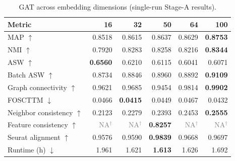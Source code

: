 \documentclass[10pt]{article}
\begin{document}
\begin{table}[H]
\centering
\scriptsize
\caption{GAT across embedding dimensions (single-run Stage-A results).}
\begin{tabular}{@{}lrrrrr@{}}
\toprule
Metric & 16 & 32 & 50 & 64 & 100 \\
\midrule
MAP $\uparrow$ & 0.8518 & 0.8615 & 0.8637 & 0.8629 & \textbf{0.8753} \\
NMI $\uparrow$ & 0.7920 & 0.8283 & 0.8258 & 0.8216 & \textbf{0.8344} \\
ASW $\uparrow$ & \textbf{0.6560} & 0.6210 & 0.6115 & 0.6041 & 0.6071 \\
Batch ASW $\uparrow$ & 0.8734 & 0.8846 & 0.8960 & 0.8892 & \textbf{0.9109} \\
Graph connectivity $\uparrow$ & 0.9621 & 0.9685 & 0.9454 & 0.9814 & \textbf{0.9902} \\
FOSCTTM $\downarrow$ & 0.0466 & \textbf{0.0415} & 0.0449 & 0.0467 & 0.0432 \\
Neighbor consistency $\uparrow$ & 0.2123 & 0.2279 & 0.2393 & 0.2453 & \textbf{0.2555} \\
Feature consistency $\uparrow$ & \textcolor{gray}{NA$^{\dagger}$} & \textcolor{gray}{NA$^{\dagger}$} & \textbf{0.8257} & \textcolor{gray}{NA$^{\dagger}$} & \textcolor{gray}{NA$^{\dagger}$} \\
Seurat alignment $\uparrow$ & 0.9576 & 0.9590 & \textbf{0.9839} & 0.9668 & 0.9697 \\
Runtime (h) $\downarrow$ & 1.961 & 1.621 & \textbf{1.613} & 1.626 & 1.692 \\
\bottomrule
\end{tabular}
\end{table}
\end{document}
